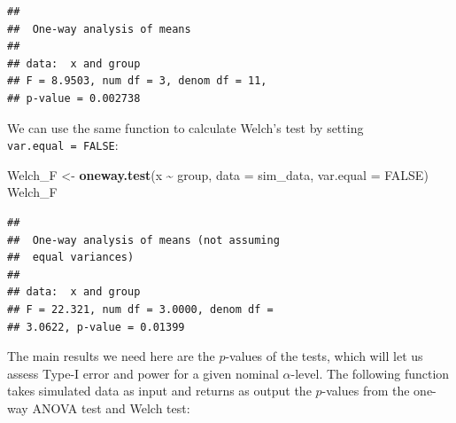 \documentclass[
]{book}
\newenvironment{Shaded}{\begin{snugshade}}{\end{snugshade}}
\newcommand{\AttributeTok}[1]{\textcolor[rgb]{0.13,0.29,0.53}{#1}}
\newcommand{\ConstantTok}[1]{\textcolor[rgb]{0.56,0.35,0.01}{#1}}
\newcommand{\ControlFlowTok}[1]{\textcolor[rgb]{0.13,0.29,0.53}{\textbf{#1}}}
\newcommand{\FunctionTok}[1]{\textcolor[rgb]{0.13,0.29,0.53}{\textbf{#1}}}
\newcommand{\NormalTok}[1]{#1}
\newcommand{\OtherTok}[1]{\textcolor[rgb]{0.56,0.35,0.01}{#1}}
\newcommand{\SpecialCharTok}[1]{\textcolor[rgb]{0.81,0.36,0.00}{\textbf{#1}}}
\begin{document}
\begin{verbatim}
## 
##  One-way analysis of means
## 
## data:  x and group
## F = 8.9503, num df = 3, denom df = 11,
## p-value = 0.002738
\end{verbatim}

We can use the same function to calculate Welch's test by setting \texttt{var.equal\ =\ FALSE}:

\begin{Shaded}
\begin{Highlighting}[]
\NormalTok{Welch\_F }\OtherTok{\textless{}{-}} \FunctionTok{oneway.test}\NormalTok{(x }\SpecialCharTok{\textasciitilde{}}\NormalTok{ group, }\AttributeTok{data =}\NormalTok{ sim\_data, }\AttributeTok{var.equal =} \ConstantTok{FALSE}\NormalTok{)}
\NormalTok{Welch\_F}
\end{Highlighting}
\end{Shaded}

\begin{verbatim}
## 
##  One-way analysis of means (not assuming
##  equal variances)
## 
## data:  x and group
## F = 22.321, num df = 3.0000, denom df =
## 3.0622, p-value = 0.01399
\end{verbatim}

The main results we need here are the \(p\)-values of the tests, which will let us assess Type-I error and power for a given nominal \(\alpha\)-level. The following function takes simulated data as input and returns as output the \(p\)-values from the one-way ANOVA test and Welch test:

\begin{Shaded}
\end{Shaded}
\end{document}
